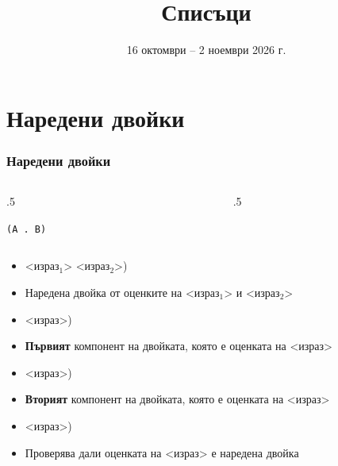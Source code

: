 \documentclass[alsotrans,beameroptions={aspectratio=169}]{beamerswitch}
\title{Списъци}
\date[16.10--2.11.2026 г.]{16 октомври -- 2 ноември 2026 г.}
\begin{document}
\begin{frame}
  \titlepage
\end{frame}

\section{Наредени двойки}

\begin{frame}
  \frametitle{Наредени двойки}

  \begin{columns}[t,onlytextwidth]
    \begin{column}{.5\textwidth}
      \vspace{2ex}
      \begin{center}
        \tt{(A . B)}
      \end{center}
    \end{column}
    \begin{column}{.5\textwidth}
      \begin{center}
      \end{center}
    \end{column}
  \end{columns}
  \pause
  \vspace{2ex}
  \begin{itemize}[<+->]
  \item {} <израз$_1$> <израз$_2$>\tta)
  \item Наредена двойка от оценките на <израз$_1$> и <израз$_2$>
  \item {} <израз>\tta)
  \item \textbf{Първият} компонент на двойката, която е оценката на <израз>
  \item {} <израз>\tta)
  \item \textbf{Вторият} компонент на двойката, която е оценката на <израз>
  \item {}   <израз>\tta)
  \item Проверява дали оценката на <израз> е наредена двойка
  \end{itemize}
\end{frame}
\end{document}
